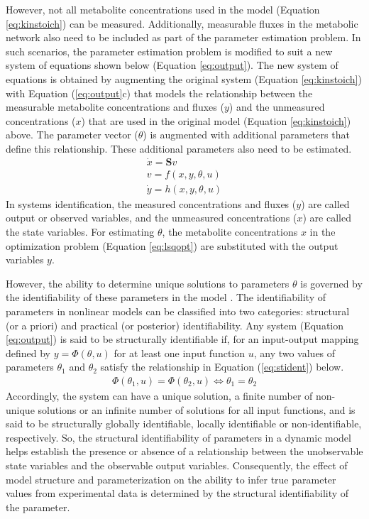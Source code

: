 \documentclass[10pt]{article}
\begin{document}
However, not all metabolite concentrations used in the model (Equation \ref{eq:kinstoich}) can be measured. Additionally, measurable fluxes in the metabolic network also need to be included as part of the parameter estimation problem. In such scenarios, the parameter estimation problem is modified to suit a new system of equations shown below (Equation \ref{eq:output}). The new system of equations is obtained by augmenting the original system (Equation \ref{eq:kinstoich}) with Equation (\ref{eq:output}c) that models the relationship between the measurable metabolite concentrations and fluxes ($y$) and the unmeasured concentrations ($x$) that are used in the original model (Equation \ref{eq:kinstoich}) above. The parameter vector ($\theta$) is augmented with additional parameters that define this relationship. These additional parameters also need to be estimated.
\begin{subequations}\label{eq:output}
	\begin{align}
	\dot{x} = \mathbf{S}v\\
	v = f(x, y, \theta, u)\\
	\dot{y} = h(x, y, \theta, u)
	\end{align}
\end{subequations}
In systems identification, the measured concentrations and fluxes ($y$) are called output or observed variables, and the unmeasured concentrations ($x$) are called the state variables. For estimating $\theta$, the metabolite concentrations $x$ in the optimization problem (Equation \ref{eq:lsqopt}) are substituted with the output variables $y$. 

However, the ability to determine unique solutions to parameters $\theta$ is governed by the identifiability of these parameters in the model \parencite{McLean2012}. The identifiability of parameters in nonlinear models can be classified into two categories: structural (or a priori) and practical (or posterior) identifiability. 	
Any system (Equation \ref{eq:output}) is said to be structurally identifiable if, for an input-output mapping defined by $y = \Phi(\theta,u)$ for at least one input function $u$, any two values of parameters $\theta_1$ and $\theta_2$ satisfy the relationship in Equation (\ref{eq:stident}) below.
\begin{align}\label{eq:stident}
\Phi(\theta_1,u) = \Phi(\theta_2,u) \iff \theta_1 = \theta_2
\end{align}
Accordingly, the system can have a unique solution, a finite number of non-unique solutions or an infinite number of solutions for all input functions, and is said to be structurally globally identifiable, locally identifiable or non-identifiable, respectively. So, the structural identifiability of parameters in a dynamic model helps establish the presence or absence of a relationship between the unobservable state variables and the observable output variables. Consequently, the effect of model structure and parameterization on the ability to infer true parameter values from experimental data is determined by the structural identifiability of the parameter. 
\end{document}
